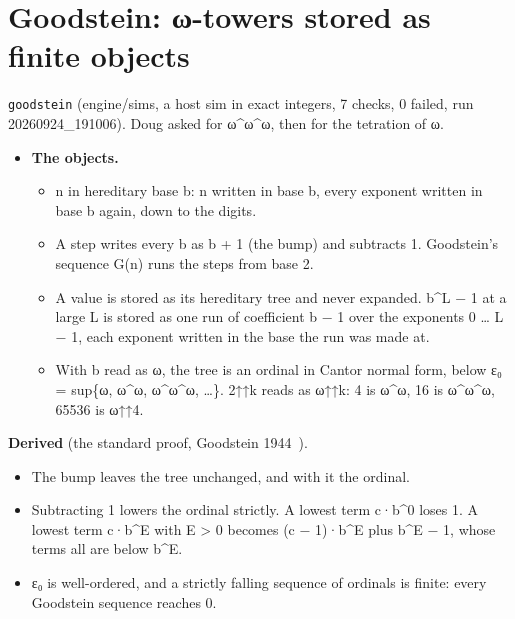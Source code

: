 \section{\texorpdfstring{Goodstein: ω-towers stored as finite objects}{Goodstein: ω-towers stored as finite objects}}

\texttt{goodstein} (engine/sims, a host sim in exact integers, 7 checks, 0 failed, run 20260924\_\allowbreak{}191006). Doug asked for ω\textasciicircum{}ω\textasciicircum{}ω, then for the tetration of ω.

\begin{itemize}
\item \textbf{The objects.}

\begin{itemize}
\item n in hereditary base b: n written in base b, every exponent written in base b again, down to the digits.
\item A step writes every b as b + 1 (the bump) and subtracts 1. Goodstein's sequence G(n) runs the steps from base 2.
\item A value is stored as its hereditary tree and never expanded. b\textasciicircum{}L − 1 at a large L is stored as one run of coefficient b − 1 over the exponents 0 … L − 1, each exponent written in the base the run was made at.
\item With b read as ω, the tree is an ordinal in Cantor normal form, below ε₀ = sup\{ω, ω\textasciicircum{}ω, ω\textasciicircum{}ω\textasciicircum{}ω, …\}. 2↑↑k reads as ω↑↑k: 4 is ω\textasciicircum{}ω, 16 is ω\textasciicircum{}ω\textasciicircum{}ω, 65536 is ω↑↑4.
\end{itemize}
\end{itemize}

\textbf{Derived} (the standard proof, Goodstein 1944~\cite{src:Goodstein-1944}).

\begin{itemize}
\item The bump leaves the tree unchanged, and with it the ordinal.
\item Subtracting 1 lowers the ordinal strictly. A lowest term c·b\textasciicircum{}0 loses 1. A lowest term c·b\textasciicircum{}E with E > 0 becomes (c − 1)·b\textasciicircum{}E plus b\textasciicircum{}E − 1, whose terms all are below b\textasciicircum{}E.
\item ε₀ is well-ordered, and a strictly falling sequence of ordinals is finite: every Goodstein sequence reaches 0.
\end{itemize}

